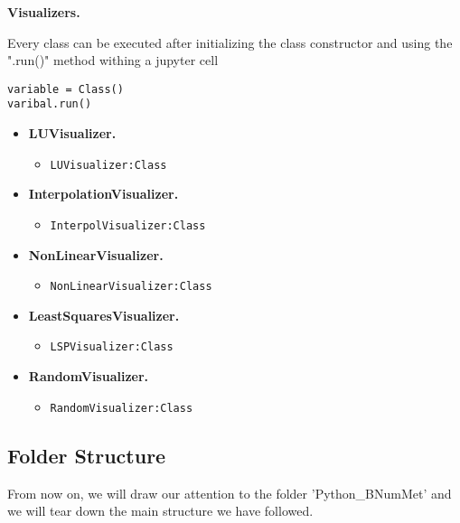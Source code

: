 \textbf{Visualizers.}

Every class can be executed after initializing the class constructor and using the ".run()" method withing a jupyter cell
\begin{lstlisting}
variable = Class()
varibal.run()
\end{lstlisting}
\begin{itemize}
\item \textbf{LUVisualizer.}
\begin{itemize}
\item \texttt{LUVisualizer:Class}
\end{itemize}
\item \textbf{InterpolationVisualizer.}
\begin{itemize}
\item \texttt{InterpolVisualizer:Class}
\end{itemize}
\item \textbf{NonLinearVisualizer.}
\begin{itemize}
\item \texttt{NonLinearVisualizer:Class}
\end{itemize}
\item \textbf{LeastSquaresVisualizer.}
\begin{itemize}
\item \texttt{LSPVisualizer:Class}
\end{itemize}
\item \textbf{RandomVisualizer.}
\begin{itemize}
\item \texttt{RandomVisualizer:Class}
\end{itemize}
\end{itemize}


\subsection*{Folder Structure}
From now on, we will draw our attention to the folder 'Python\_BNumMet' and we will tear down the main structure we have followed.

